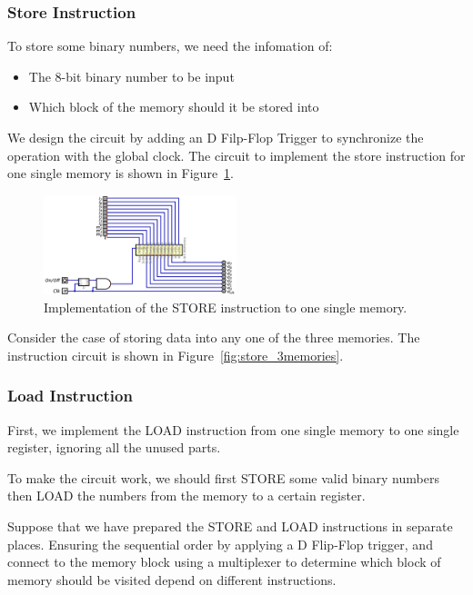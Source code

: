 \documentclass[conference]{IEEEtran}
\begin{document}
\subsubsection{Store Instruction}
To store some binary numbers, we need the infomation of:
\begin{itemize}
    \item The 8-bit binary number to be input
    \item Which block of the memory should it be stored into
\end{itemize}

We design the circuit by adding an D Filp-Flop Trigger to synchronize the operation with the global clock. The circuit to implement the store instruction for one single memory is shown in Figure~\ref{fig:store_1bit}.

\begin{figure}[h!]
    \centering
    \includegraphics[width=0.5\textwidth]{assets/store_1bit.png}
    \caption{Implementation of the STORE instruction to one single memory.}
    \label{fig:store_1bit}
\end{figure}


Consider the case of storing data into any one of the three memories. The instruction circuit is shown in Figure~\ref{fig:store_3memories}.




\subsubsection{Load Instruction}

First, we implement the LOAD instruction from one single memory to one single register, ignoring all the unused parts.

To make the circuit work, we should first STORE some valid binary numbers then LOAD the numbers from the memory to a certain register.


Suppose that we have prepared the STORE and LOAD instructions in separate places. Ensuring the sequential order by applying a D Flip-Flop trigger, and connect to the memory block using a multiplexer to determine which block of memory should be 
visited depend on different instructions.
\end{document}
